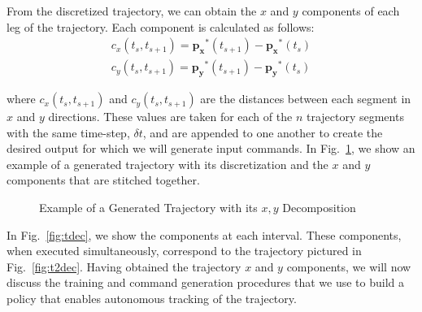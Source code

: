 \documentclass[letterpaper, 10 pt, conference]{ieeeconf}  %
\begin{document}
From the discretized trajectory, we can obtain the $x$ and $y$ components of each leg of the trajectory. Each component is calculated as follows:
\begin{align}
    c_{x}(t_s,t_{s+1}) = \bm{p_x}^*(t_{s+1}) - \bm{p_x}^*(t_{s}) \nonumber \\
    c_{y}(t_s,t_{s+1}) = \bm{p_y}^*(t_{s+1}) - \bm{p_y}^*(t_{s})
\end{align}

where $c_{x}(t_s,t_{s+1})$ and $c_{y}(t_s,t_{s+1})$ are the distances between each segment in $x$ and $y$ directions. These values are taken for each of the $n$ trajectory segments with the same time-step, $\delta t$, and are appended to one another to create the desired output for which we will generate input commands. In Fig.~\ref{fig:trajdec}, we show an example of a generated trajectory with its discretization and the $x$ and $y$ components that are stitched together.
\begin{figure}[h]
	\centering
	\caption{Example of a Generated Trajectory with its $x,y$ Decomposition}
	\label{fig:trajdec}
\end{figure}

In Fig.~\ref{fig:tdec}, we show the components at each interval. These components, when executed simultaneously, correspond to the trajectory pictured in Fig.~\ref{fig:t2dec}. Having obtained the trajectory $x$ and $y$ components, we will now discuss the training and command generation procedures that we use to build a policy that enables autonomous tracking of the trajectory.
\end{document}
